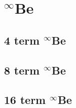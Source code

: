 \documentclass[12pt,thmsa,suthesis,verbatim]{report}
\begin{document}
{\normalsize \renewcommand{\baselinestretch}{1} \footnotesize %
 }

\section{$^\infty $Be}

\subsection{4 term $^\infty $Be}

{\normalsize \renewcommand{\baselinestretch}{1} \footnotesize %
 }

\subsection{8 term $^\infty $Be}

{\normalsize \renewcommand{\baselinestretch}{1} \footnotesize %
 }

\subsection{16 term $^\infty $Be}

{\normalsize \renewcommand{\baselinestretch}{1} \footnotesize %
 }
\end{document}
